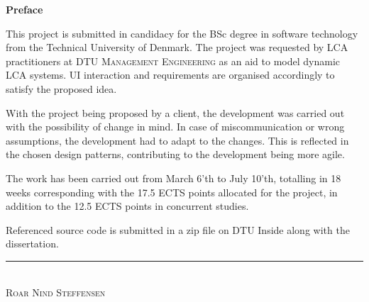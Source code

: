 \vspace*{\fill}
\begin{center}
    \huge \textbf{Preface}
\end{center}
\normalsize
\vspace{1cm}

This project is submitted in candidacy for the BSc degree in software technology from the Technical University of Denmark. The project was requested by LCA practitioners at \textsc{DTU Management Engineering} as an aid to model dynamic LCA systems. UI interaction and requirements are organised accordingly to satisfy the proposed idea. 

With the project being proposed by a client, the development was carried out with the possibility of change in mind. In case of miscommunication or wrong assumptions, the development had to adapt to the changes. This is reflected in the chosen design patterns, contributing to the development being more agile.

The work has been carried out from March 6'th to July 10'th, totalling in 18 weeks corresponding with the 17.5 ECTS points allocated for the project, in addition to the 12.5 ECTS points in concurrent studies. 

Referenced source code is submitted in a zip file on DTU Inside along with the dissertation.
\vspace*{4cm}

\vfill
\begin{center}
    \noindent\rule{8cm}{0.4pt} \vspace{1mm}\\
    \textsc{ \small Roar Nind Steffensen}
\end{center}
{}

